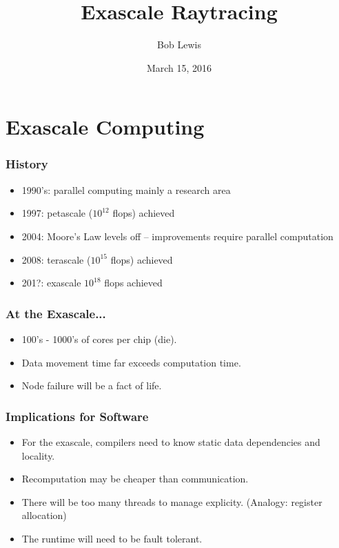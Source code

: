 \documentclass{beamer}
\title{Exascale Raytracing}
\author{Bob Lewis}
\institute{School of Engineering and Applied Science \\
  Washington State University, Tri-Cities}
\date{March 15, 2016}
\begin{document}
\begin{frame}
  \titlepage
\end{frame}

\begin{comment}
\begin{frame}
  \frametitle{Outline}
  \tableofcontents
\end{frame}
\end{comment}

\section{Exascale Computing}

\begin{frame}
  \frametitle{History}

  \begin{itemize}
  \item 1990's: parallel computing mainly a research area
  \item 1997: petascale ($10^{12}$ flops) achieved
  \item 2004: Moore's Law levels off -- improvements require parallel
    computation
  \item 2008: terascale ($10^{15}$ flops) achieved
  \item 201?: exascale $10^{18}$ flops achieved
  \end{itemize}
\end{frame}


\begin{frame}
  \frametitle{At the Exascale...}

  \begin{itemize}
  \item 100's - 1000's of cores per chip (die).
  \item Data movement time far exceeds computation time.
  \item Node failure will be a fact of life.
  \end{itemize}
\end{frame}


\begin{frame}
  \frametitle{Implications for Software}

  \begin{itemize}
  \item For the exascale, compilers need to know static data
    dependencies and locality.
  \item Recomputation may be cheaper than communication.
  \item There will be too many threads to manage explicity. (Analogy:
    register allocation)
  \item The runtime will need to be fault tolerant.
  \end{itemize}
\end{frame}
\end{document}
